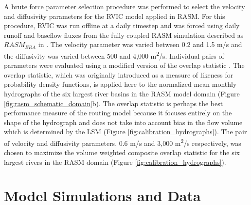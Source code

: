 \documentclass[jgrga, draft]{agutex}
\begin{document}
\begin{article}
A brute force parameter selection procedure was performed to select the velocity and diffusivity parameters for the RVIC model applied in RASM.
For this procedure, RVIC was run offline at a daily timestep and was forced using daily runoff and baseflow fluxes from the fully coupled RASM simulation described as $RASM_{ERA}$ in \citep{Hamman_2016}.
The velocity parameter was varied between 0.2 and 1.5 m/s and the diffusivity was varied between 500 and 4,000 m\textsuperscript{2}/s.
Individual pairs of parameters were evaluated using a modified version of the overlap statistic \citep{Perkins_2012}.
The overlap statistic, which was originally introduced as a measure of likeness for probability density functions, is applied here to the normalized mean monthly hydrographs of the six largest river basins in the RASM model domain (Figure \ref{fig:rasm_schematic_domain}b).
The overlap statistic is perhaps the best performance measure of the routing model because it focuses entirely on the shape of the hydrograph and does not take into account bias in the flow volume which is determined by the LSM (Figure \ref{fig:calibration_hydrographs}).
The pair of velocity and diffusivity parameters, 0.6 m/s and 3,000 m\textsuperscript{2}/s respectively, was chosen to maximize the volume weighted composite overlap statistic for the six largest rivers in the RASM domain (Figure \ref{fig:calibration_hydrographs}).

\section{Model Simulations and Data}
\label{sec:data}


\end{article}
\end{document}
